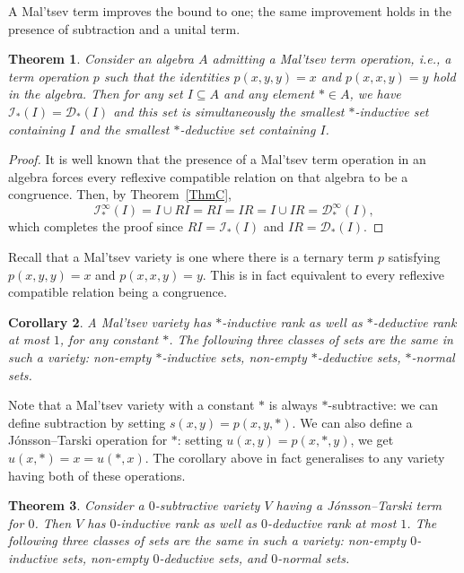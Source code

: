 \documentclass[12pt,english]{amsart}
\newtheorem{theorem}{Theorem}[section]
\newtheorem{corollary}[theorem]{Corollary}
\theoremstyle{definition}
\numberwithin{equation}{section}
\theoremstyle{remark}
\newcommand{\ind}[1]{\mathcal{I}_\top(#1)}
\newcommand{\indn}[2]{\mathcal{I}^{#2}_\top(#1)}
\newcommand{\ded}[1]{\mathcal{D}_\top(#1)}
\newcommand{\dedn}[2]{\mathcal{D}^{#2}_\top(#1)}
\renewcommand{\top}{\ast}
\begin{document}
A Mal'tsev term improves the bound to one; the same improvement holds in the presence of subtraction and a unital term.

\begin{theorem}\label{ThmMalcevRank}
Consider an algebra $A$ admitting a Mal'tsev term operation, i.e., a term operation $p$ such that the identities $p(x,y,y)=x$ and $p(x,x,y)=y$ hold in the algebra. Then for any set $I\subseteq A$ and any element $\ast\in A$, we have $\ind I=\ded I$ and this set is simultaneously the smallest $\ast$-inductive set containing $I$ and the smallest $\ast$-deductive set containing $I$.
\end{theorem}

\begin{proof}
It is well known that the presence of a Mal'tsev term operation in an algebra forces every reflexive compatible relation on that algebra to be a congruence. Then, by Theorem~\ref{ThmC},
$$\indn{I}{\infty}=I\cup RI=RI=IR=I\cup IR=\dedn{I}{\infty},$$
which completes the proof since $RI=\ind I$ and $IR=\ded I$.
\end{proof}

Recall that a Mal'tsev variety is one where there is a ternary term $p$ satisfying $p(x,y,y)=x$ and $p(x,x,y)=y$. This is in fact equivalent to every reflexive compatible relation being a congruence.

\begin{corollary}\label{CorB}
A Mal'tsev variety has $\ast$-inductive rank as well as $\ast$-deductive rank at most $1$, for any constant $\ast$.  The following three classes of sets are the same in such a variety: non-empty $\ast$-inductive sets, non-empty $\ast$-deductive sets, $\ast$-normal sets.
\end{corollary}

Note that a Mal'tsev variety with a constant $\ast$ is always $\ast$-subtractive: we can define subtraction by setting $s(x,y)=p(x,y,\ast)$. We can also define a J\'onsson--Tarski operation for $\ast$: setting $u(x,y)=p(x,\ast,y)$, we get $u(x,\ast)=x=u(\ast,x)$.
The corollary above in fact generalises to any variety having both of these operations.

\begin{theorem}\label{ThmStrongUnitalRank}
Consider a $0$-subtractive variety $V$ having a J\'onsson--Tarski term for $0$. Then $V$ has $0$-inductive rank as well as $0$-deductive rank at most $1$. The following three classes of sets are the same in such a variety: non-empty $0$-inductive sets, non-empty $0$-deductive sets, and $0$-normal sets.
\end{theorem}
\end{document}
